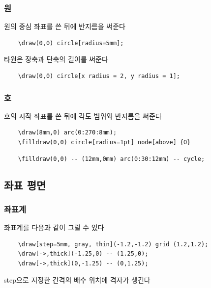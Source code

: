 \documentclass[12pt]{beamer}
\begin{document}
\subsubsection{원}
\begin{frame}[fragile]{\secname}{\subsecname}
	원의 중심 좌표를 쓴 뒤에 반지름을 써준다
	
	\begin{lstlisting}
	\draw(0,0) circle[radius=5mm];
	\end{lstlisting}
	
	
	타원은 장축과 단축의 길이를 써준다
	\begin{lstlisting}
	\draw(0,0) circle[x radius = 2, y radius = 1];
	\end{lstlisting}
	
\end{frame}

\subsubsection{호}
\begin{frame}[fragile]{\secname}{\subsecname}
	호의 시작 좌표를 쓴 뒤에 각도 범위와 반지름을 써준다	
	\begin{lstlisting}
	\draw(8mm,0) arc(0:270:8mm);
	\filldraw(0,0) circle[radius=1pt] node[above] {O}
	\end{lstlisting}
	
	\begin{lstlisting}
	\filldraw(0,0) -- (12mm,0mm) arc(0:30:12mm) -- cycle;
	\end{lstlisting}
	
\end{frame}


\subsection{좌표 평면}
\subsubsection{좌표계}
\begin{frame}[fragile]{\secname}{\subsecname}
	좌표계를 다음과 같이 그릴 수 있다
	\begin{lstlisting}
	\draw[step=5mm, gray, thin](-1.2,-1.2) grid (1.2,1.2);
	\draw[->,thick](-1.25,0) -- (1.25,0);
	\draw[->,thick](0,-1.25) -- (0,1.25);
	\end{lstlisting}
	
	\vfill
	step으로 지정한 간격의 배수 위치에 격자가 생긴다
\end{frame}
\end{document}
